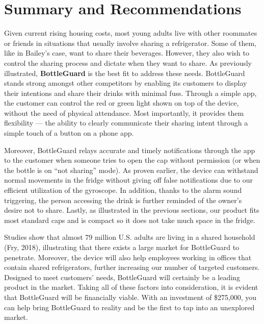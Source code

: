 \documentclass[12pt]{article}
\begin{document}
	\section*{Summary and Recommendations}
		
		Given current rising housing costs, most young adults live with other roommates or friends in situations that usually involve sharing a refrigerator. Some of them, like in Bailey’s case, want to share their beverages. However, they also wish to control the sharing process and dictate when they want to share. As previously illustrated, \textbf{BottleGuard} is the best fit to address these needs. BottleGuard stands strong amongst other competitors by enabling its customers to display their intentions and share their drinks with minimal fuss.  Through a simple app, the customer can control the red or green light shown on top of the device, without the need of physical attendance. Most importantly, it provides them flexibility — the ability to clearly communicate their sharing intent through a simple touch of a button on a phone app.
		
		Moreover, BottleGuard relays accurate and timely notifications through the app to the customer when someone tries to open the cap without permission (or when the bottle is on “not sharing” mode). As proven earlier, the device can withstand normal movements in the fridge without giving off false notifications due to our efficient utilization of the gyroscope. In addition, thanks to the alarm sound triggering, the person accessing the drink is further reminded of the owner’s desire not to share. Lastly, as illustrated in the previous sections, our product fits most standard caps and is compact so it does not take much space in the fridge. 
		
		Studies show that almost 79 million U.S. adults are living in a shared household (Fry, 2018), illustrating that there exists a large market for BottleGuard to penetrate. Moreover, the device will also help employees working in offices that contain shared refrigerators, further increasing our number of targeted customers. Designed to meet customers’ needs, BottleGuard will certainly be a leading product in the market. Taking all of these factors into consideration, it is evident that BottleGuard will be financially viable. With an investment of \$275,000, you can help bring BottleGuard to reality and be the first to tap into an unexplored market.
		

		
		\newpage
\end{document}
